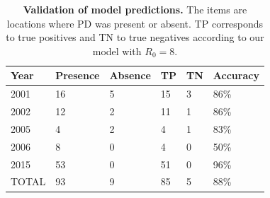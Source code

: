     \begin{table}
        \begin{center}
            \caption{\textbf{Validation of model predictions.} The items are
                locations
                where PD was present or absent. TP corresponds to true
                positives and TN to true
                negatives according to our model with $R_0=8$. }
            \label{tab:validation}
            \begin{tabular}{llllll}
                \hline
                Year  & Presence & Absence & TP & TN & Accuracy \\
                \hline
                2001  & 16       & 5       & 15 & 3  & 86\%     \\
                2002  & 12       & 2       & 11 & 1  & 86\%     \\
                2005  & 4        & 2       & 4  & 1  & 83\%     \\
                2006  & 8        & 0       & 4  & 0  & 50\%     \\
                2015  & 53       & 0       & 51 & 0  & 96\%     \\
                TOTAL & 93       & 9       & 85 & 5  & 88\%     \\
                \hline
            \end{tabular}
        \end{center}
    \end{table}

